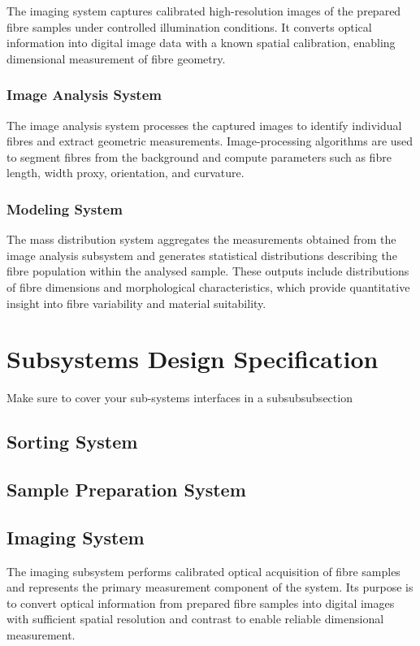 \documentclass[a4paper, 12pt, english]{article}
\begin{document}
The imaging system captures calibrated high-resolution images of the prepared fibre samples under controlled illumination conditions. It converts optical information into digital image data with a known spatial calibration, enabling dimensional measurement of fibre geometry.

\subsubsection{Image Analysis System
}
The image analysis system processes the captured images to identify individual fibres and extract geometric measurements. Image-processing algorithms are used to segment fibres from the background and compute parameters such as fibre length, width proxy, orientation, and curvature.

\subsubsection{Modeling System}

The mass distribution system aggregates the measurements obtained from the image analysis subsystem and generates statistical distributions describing the fibre population within the analysed sample. These outputs include distributions of fibre dimensions and morphological characteristics, which provide quantitative insight into fibre variability and material suitability.

\section{Subsystems Design Specification}

Make sure to cover your sub-systems interfaces in a subsubsubsection{}

\subsection{Sorting System}

\subsection{Sample Preparation System}

\subsection{Imaging System}

The imaging subsystem performs calibrated optical acquisition of fibre samples and represents the primary measurement component of the system. Its purpose is to convert optical information from prepared fibre samples into digital images with sufficient spatial resolution and contrast to enable reliable dimensional measurement.
\end{document}
